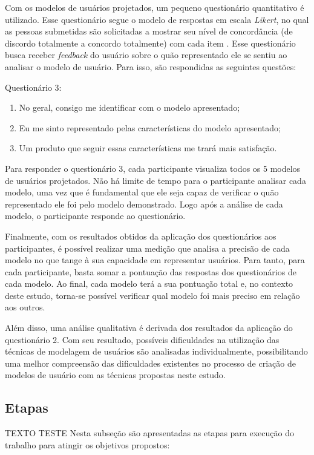 \documentclass[12pt]{article}
\begin{document}
Com os modelos de usuários projetados, um pequeno questionário quantitativo é utilizado. Esse questionário segue o modelo de respostas em escala \emph{Likert}, no qual as pessoas submetidas são solicitadas a mostrar seu nível de concordância (de discordo totalmente a concordo totalmente) com cada item \cite{likert_scale}. Esse questionário busca receber \emph{feedback} do usuário sobre o quão representado ele se sentiu ao analisar o modelo de usuário. Para isso, são respondidas as seguintes questões: 
\par Questionário 3:
\begin{enumerate}\setlength\itemsep{0.5em}
        \item No geral, consigo me identificar com o modelo apresentado;
        \item Eu me sinto representado pelas características do modelo apresentado;
        \item Um produto que seguir essas características me trará mais satisfação.
\end{enumerate}
Para responder o questionário 3, cada participante visualiza todos os 5 modelos de usuários projetados. Não há limite de tempo para o participante analisar cada modelo, uma vez que é fundamental que ele seja capaz de verificar o quão representado ele foi pelo modelo demonstrado. Logo após a análise de cada modelo, o participante responde ao questionário.

Finalmente, com os resultados obtidos da aplicação dos questionários aos participantes, é possível realizar uma medição que analisa a precisão de cada modelo no que tange à sua capacidade em representar usuários. Para tanto, para cada participante, basta somar a pontuação das respostas dos questionários de cada modelo. Ao final, cada modelo terá a sua pontuação total e, no contexto deste estudo, torna-se possível verificar qual modelo foi mais preciso em relação aos outros.
        
Além disso, uma análise qualitativa é derivada dos resultados da aplicação do questionário 2. Com seu resultado, possíveis dificuldades na utilização das técnicas de modelagem de usuários são analisadas individualmente, possibilitando uma melhor compreensão das dificuldades existentes no processo de criação de modelos de usuário com as técnicas propostas neste estudo.
        
\subsection{Etapas}
TEXTO TESTE
Nesta subseção são apresentadas as etapas para execução do trabalho para atingir os objetivos propostos:
\end{document}
